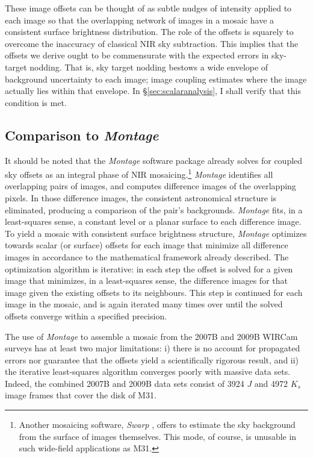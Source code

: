\documentclass[iop]{emulateapj}
\newcommand{\sw}[1]{\textit{#1}} %
\begin{document}
These image offsets can be thought of as subtle nudges of intensity applied to each image so that the overlapping network of images in a mosaic have a consistent surface brightness distribution. The role of the offsets is squarely to overcome the inaccuracy of classical NIR sky subtraction. This implies that the offsets we derive ought to be commensurate with the expected errors in sky-target nodding. That is, sky target nodding bestows a wide envelope of background uncertainty to each image; image coupling estimates where the image actually lies within that envelope. In \S \ref{sec:scalaranalysis}, I shall verify that this condition is met.


\subsection{Comparison to \sw{Montage}}
It should be noted that the \sw{Montage} software package \citep{Berriman:2008} already solves for coupled sky offsets as an integral phase of NIR mosaicing.\footnote{Another mosaicing software, \sw{Swarp} \citep{Bertin:2002}, offers to estimate the sky background from the surface of images themselves. This mode, of course, is unusable in such wide-field applications as M31.} \sw{Montage} identifies all overlapping pairs of images, and computes difference images of the overlapping pixels. In those difference images, the consistent astronomical structure is eliminated, producing a comparison of the pair's backgrounds. \sw{Montage} fits, in a least-squares sense, a constant level or a planar surface to each difference image. To yield a mosaic with consistent surface brightness structure, \sw{Montage} optimizes towards scalar (or surface) offsets for each image that minimize all difference images in accordance to the mathematical framework already described. The optimization algorithm is iterative: in each step the offset is solved for a given image that minimizes, in a least-squares sense, the difference images for that image given the existing offsets to its neighbours. This step is continued for each image in the mosaic, and is again iterated many times over until the solved offsets converge within a specified precision.

The use of \sw{Montage} to assemble a mosaic from the 2007B and 2009B WIRCam surveys has at least two major limitations: i) there is no account for propagated errors nor guarantee that the offsets yield a scientifically rigorous result, and ii) the iterative least-squares algorithm converges poorly with massive data sets. Indeed, the combined 2007B and 2009B data sets consist of 3924 $J$ and 4972 $K_s$ image frames that cover the disk of M31.
\end{document}
